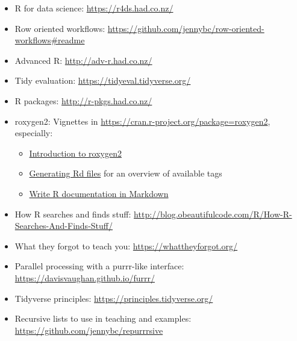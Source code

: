 \documentclass[]{book}
\begin{document}
\begin{itemize}
\item
  R for data science: \url{https://r4ds.had.co.nz/}
\item
  Row oriented workflows: \url{https://github.com/jennybc/row-oriented-workflows\#readme}
\item
  Advanced R: \url{http://adv-r.had.co.nz/}
\item
  Tidy evaluation: \url{https://tidyeval.tidyverse.org/}
\item
  R packages: \url{http://r-pkgs.had.co.nz/}
\item
  roxygen2: Vignettes in \url{https://cran.r-project.org/package=roxygen2}, especially:

  \begin{itemize}
  \item
    \href{https://cran.r-project.org/web/packages/roxygen2/vignettes/roxygen2.html}{Introduction to roxygen2}
  \item
    \href{https://cran.r-project.org/web/packages/roxygen2/vignettes/rd.html}{Generating Rd files} for an overview of available tags
  \item
    \href{https://cran.r-project.org/web/packages/roxygen2/vignettes/markdown.html}{Write R documentation in Markdown}
  \end{itemize}
\item
  How R searches and finds stuff: \url{http://blog.obeautifulcode.com/R/How-R-Searches-And-Finds-Stuff/}
\item
  What they forgot to teach you: \url{https://whattheyforgot.org/}
\item
  Parallel processing with a purrr-like interface: \url{https://davisvaughan.github.io/furrr/}
\item
  Tidyverse principles: \url{https://principles.tidyverse.org/}
\item
  Recursive lists to use in teaching and examples: \url{https://github.com/jennybc/repurrrsive}
\end{itemize}


\end{document}
